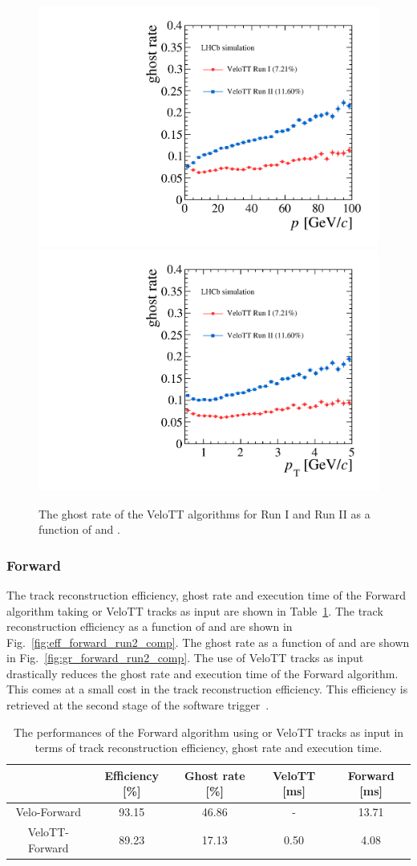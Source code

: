 \begin{figure}[!tb]
  \begin{center}
    \includegraphics[width=0.45\linewidth]{figs/upstream-tracking-run2/VeloTT-gr-p.pdf}
    \includegraphics[width=0.45\linewidth]{figs/upstream-tracking-run2/VeloTT-gr-pt.pdf}
    \caption{The ghost rate of the VeloTT algorithms for Run I and Run II as a function of \ptot and \pt.}
    \label{fig:gr_velott_comp}
  \end{center}
\end{figure}

\subsubsection{Forward}

The track reconstruction efficiency, ghost rate and execution time of the Forward algorithm taking \velo or VeloTT tracks as input are shown in Table~\ref{tab:perf_forward_run2_comp}. The track reconstruction efficiency as a function of \ptot and \pt are shown in Fig.~\ref{fig:eff_forward_run2_comp}. The ghost rate as a function of \ptot and \pt are shown in Fig.~\ref{fig:gr_forward_run2_comp}. The use of VeloTT tracks as input drastically reduces the ghost rate and execution time of the Forward algorithm. This comes at a small cost in the track reconstruction efficiency. This efficiency is retrieved at the second stage of the software trigger~\cite{hlt-runII}.

\begin{table}[!tb]
  \caption{The performances of the Forward algorithm using \velo or VeloTT tracks as input in terms of track reconstruction efficiency, ghost rate and execution time.}
  \label{tab:perf_forward_run2_comp}
  \begin{center}
    \begin{tabular}{c|c|c|c|c}
      & Efficiency [\%] & Ghost rate [\%] & VeloTT [ms] & Forward [ms] \\ 
      \hline
      Velo-Forward  & 93.15  & 46.86  &  -  & 13.71 \\ 
      VeloTT-Forward  & 89.23  & 17.13  &  0.50 & \hphantom{0}4.08 \\
    \end{tabular}
  \end{center}
\end{table}


